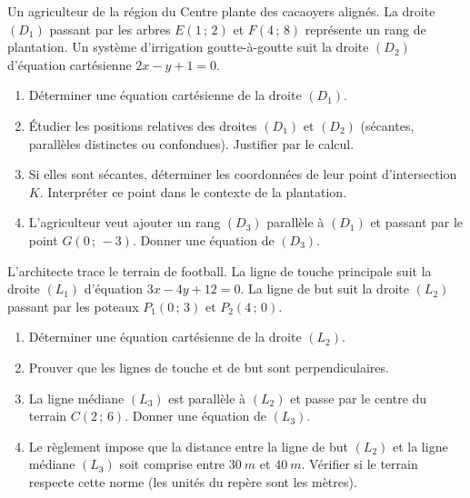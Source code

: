 \documentclass[11pt]{article}
\begin{document}
\begin{exercice}
Un agriculteur de la région du Centre plante des cacaoyers alignés. La droite $(D_1)$ passant par les arbres $E(1\,;\,2)$ et $F(4\,;\,8)$ représente un rang de plantation. Un système d'irrigation goutte-à-goutte suit la droite $(D_2)$ d'équation cartésienne $2x - y + 1 = 0$.
\begin{enumerate}
    \item Déterminer une équation cartésienne de la droite $(D_1)$.
    \item Étudier les positions relatives des droites $(D_1)$ et $(D_2)$ (sécantes, parallèles distinctes ou confondues). Justifier par le calcul.
    \item Si elles sont sécantes, déterminer les coordonnées de leur point d'intersection $K$. Interpréter ce point dans le contexte de la plantation.
    \item L'agriculteur veut ajouter un rang $(D_3)$ parallèle à $(D_1)$ et passant par le point $G(0\,;\,-3)$. Donner une équation de $(D_3)$.
\end{enumerate}
\end{exercice}

\begin{exercice}
L'architecte trace le terrain de football. La ligne de touche principale suit la droite $(L_1)$ d'équation $3x - 4y + 12 = 0$. La ligne de but suit la droite $(L_2)$ passant par les poteaux $P_1(0\,;\,3)$ et $P_2(4\,;\,0)$.
\begin{enumerate}
    \item Déterminer une équation cartésienne de la droite $(L_2)$.
    \item Prouver que les lignes de touche et de but sont perpendiculaires.
    \item La ligne médiane $(L_3)$ est parallèle à $(L_2)$ et passe par le centre du terrain $C(2\,;\,6)$. Donner une équation de $(L_3)$.
    \item Le règlement impose que la distance entre la ligne de but $(L_2)$ et la ligne médiane $(L_3)$ soit comprise entre $\SI{30}{m}$ et $\SI{40}{m}$. Vérifier si le terrain respecte cette norme (les unités du repère sont les mètres).
\end{enumerate}
\end{exercice}
\end{document}
